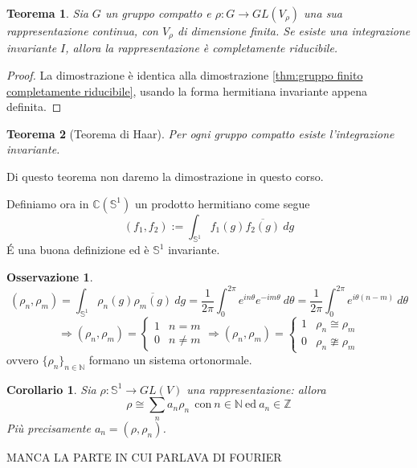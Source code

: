 \documentclass[11pt]{article}
\theoremstyle{plain}
\newtheorem{thm}{Teorema}[section]
\newtheorem*{cor}{Corollario}
\theoremstyle{definition}
\newtheorem*{rem}{Osservazione}
\theoremstyle{remark}
\newcommand{\C}{\mathbb{C}}
\newcommand{\Z}{\mathbb{Z}}
\newcommand{\N}{\mathbb{N}}
\newcommand{\dint}{\displaystyle\int}
\begin{document}
\begin{thm} Sia $G$ un gruppo compatto e $\rho : G \to GL(V_\rho)$ una sua rappresentazione continua, con $V_\rho$ di dimensione finita. Se esiste una integrazione invariante $I$, allora la rappresentazione è completamente riducibile.

\end{thm}

\begin{proof}
  La dimostrazione è identica alla dimostrazione \ref{thm:gruppo finito completamente riducibile}, usando la forma hermitiana invariante appena definita.
\end{proof}


\begin{thm}[Teorema di Haar]
Per ogni gruppo compatto esiste l'integrazione invariante.
\end{thm}

Di questo teorema non daremo la dimostrazione in questo corso.

Definiamo ora in $\C(\mathbb{S}^1)$ un prodotto hermitiano come segue
\[(f_1,f_2):=\dint_{\mathbb{S}^1}f_1(g)\overline{f_2(g)}\ dg\]
\'E una buona definizione ed è $\mathbb{S}^1$ invariante.
\begin{rem}
\[(\rho_n,\rho_m)=\dint_{\mathbb{S}^1}\rho_n(g)\overline{\rho_m(g)}\ dg=\frac{1}{2\pi}\dint_0^{2\pi}e^{in\theta}e^{-im\theta}\ d\theta=\frac{1}{2\pi}\dint_0^{2\pi}e^{i\theta (n-m)}\ d\theta \]
\[\Rightarrow (\rho_n,\rho_m)=\left\{\begin{matrix}
1 & n=m\\
0 & n\neq m
\end{matrix}\right.\Rightarrow (\rho_n,\rho_m)=\left\{\begin{matrix}
1 & \rho_n\cong \rho_m\\
0 & \rho_n \ncong \rho_m
\end{matrix}\right.\]
ovvero $\{\rho_n\}_{n\in \N}$ formano un sistema ortonormale.
\end{rem}
\begin{cor} Sia $\rho: \mathbb{S}^1\rightarrow GL(V)$ una rappresentazione: allora
\[\rho\cong \sum_n a_n\rho_n\ \ \text{con}\ n\in \N\ \text{ed}\ a_n\in \Z\]
Più precisamente $a_n=(\rho,\rho_n)$.
\end{cor}

MANCA LA PARTE IN CUI PARLAVA DI FOURIER
\end{document}
